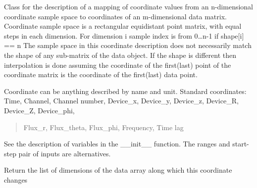 \documentclass[letterpaper,10pt,english]{sphinxmanual}
\begin{document}
\begin{fulllineitems}
\label{\detokenize{coordinate:flap.coordinate.Coordinate}}
Class for the description of a mapping of coordinate values from an n-dimensional coordinate
sample space to coordinates of an m-dimensional data matrix.
Coordinate sample space is a rectangular equidistant point matrix, with equal steps in each dimension.
For dimension i sample index is from 0…n-1 if shape{[}i{]} == n
The sample space in this coordinate description does not necessarily match the shape of
any sub-matrix of the data object. If the shape is different then interpolation is done assuming
the coordinate of the first(last) point of the coordinate matrix is the coordinate of the first(last)
data point.

Coordinate can be anything described by name and unit.
Standard coordinates: Time, Channel, Channel number, Device\_x, Device\_y, Device\_z, Device\_R, Device\_Z, Device\_phi,
\begin{quote}

Flux\_r, Flux\_theta, Flux\_phi, Frequency, Time lag
\end{quote}

See the description of variables in the \_\_init\_\_ function.
The ranges and start-step pair of inputs are alternatives.

\begin{fulllineitems}
\label{\detokenize{coordinate:flap.coordinate.Coordinate.change_dimensions}}
Return the list of dimensions of the data array along which this coordinate
changes

\end{fulllineitems}



\end{fulllineitems}
\end{document}
